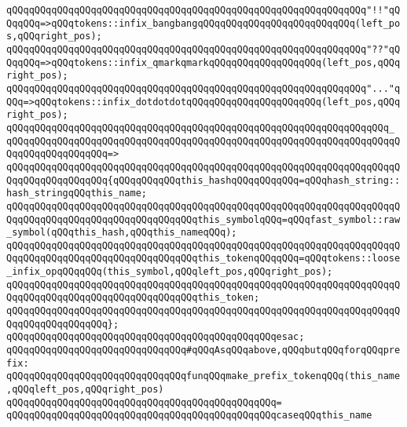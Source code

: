\verb|qQQqqQQqqQQqqQQqqQQqqQQqqQQqqQQqqQQqqQQqqQQqqQQqqQQqqQQqqQQqqQQq"!!"qQQqqQQq=>qQQqtokens::infix_bangbangqQQqqQQqqQQqqQQqqQQqqQQqqQQq(left_pos,qQQqright_pos);|\newline
\verb|qQQqqQQqqQQqqQQqqQQqqQQqqQQqqQQqqQQqqQQqqQQqqQQqqQQqqQQqqQQqqQQq"??"qQQqqQQq=>qQQqtokens::infix_qmarkqmarkqQQqqQQqqQQqqQQqqQQq(left_pos,qQQqright_pos);|\newline
\verb|qQQqqQQqqQQqqQQqqQQqqQQqqQQqqQQqqQQqqQQqqQQqqQQqqQQqqQQqqQQqqQQq"..."qQQq=>qQQqtokens::infix_dotdotdotqQQqqQQqqQQqqQQqqQQqqQQq(left_pos,qQQqright_pos);|\newline
\verb|qQQqqQQqqQQqqQQqqQQqqQQqqQQqqQQqqQQqqQQqqQQqqQQqqQQqqQQqqQQqqQQqqQQq_|\newline
\verb|qQQqqQQqqQQqqQQqqQQqqQQqqQQqqQQqqQQqqQQqqQQqqQQqqQQqqQQqqQQqqQQqqQQqqQQqqQQqqQQqqQQqqQQq=>|\newline
\verb|qQQqqQQqqQQqqQQqqQQqqQQqqQQqqQQqqQQqqQQqqQQqqQQqqQQqqQQqqQQqqQQqqQQqqQQqqQQqqQQqqQQqqQQq{qQQqqQQqqQQqthis_hashqQQqqQQqqQQq=qQQqhash_string::hash_stringqQQqthis_name;|\newline
\verb|qQQqqQQqqQQqqQQqqQQqqQQqqQQqqQQqqQQqqQQqqQQqqQQqqQQqqQQqqQQqqQQqqQQqqQQqqQQqqQQqqQQqqQQqqQQqqQQqqQQqqQQqthis_symbolqQQq=qQQqfast_symbol::raw_symbol(qQQqthis_hash,qQQqthis_nameqQQq);|\newline
\verb|qQQqqQQqqQQqqQQqqQQqqQQqqQQqqQQqqQQqqQQqqQQqqQQqqQQqqQQqqQQqqQQqqQQqqQQqqQQqqQQqqQQqqQQqqQQqqQQqqQQqqQQqthis_tokenqQQqqQQq=qQQqtokens::loose_infix_opqQQqqQQq(this_symbol,qQQqleft_pos,qQQqright_pos);|\newline
\newline
\verb|qQQqqQQqqQQqqQQqqQQqqQQqqQQqqQQqqQQqqQQqqQQqqQQqqQQqqQQqqQQqqQQqqQQqqQQqqQQqqQQqqQQqqQQqqQQqqQQqqQQqqQQqthis_token;|\newline
\verb|qQQqqQQqqQQqqQQqqQQqqQQqqQQqqQQqqQQqqQQqqQQqqQQqqQQqqQQqqQQqqQQqqQQqqQQqqQQqqQQqqQQqqQQq};|\newline
\verb|qQQqqQQqqQQqqQQqqQQqqQQqqQQqqQQqqQQqqQQqqQQqqQQqesac;|\newline
\newline
\verb|qQQqqQQqqQQqqQQqqQQqqQQqqQQqqQQq#qQQqAsqQQqabove,qQQqbutqQQqforqQQqprefix:|\newline
\newline
\verb|qQQqqQQqqQQqqQQqqQQqqQQqqQQqqQQqfunqQQqmake_prefix_tokenqQQq(this_name,qQQqleft_pos,qQQqright_pos)|\newline
\verb|qQQqqQQqqQQqqQQqqQQqqQQqqQQqqQQqqQQqqQQqqQQqqQQq=|\newline
\verb|qQQqqQQqqQQqqQQqqQQqqQQqqQQqqQQqqQQqqQQqqQQqqQQqcaseqQQqthis_name|\newline
